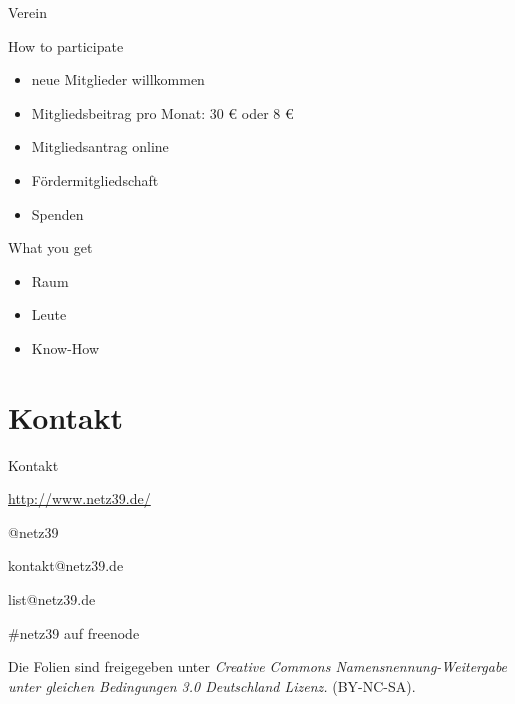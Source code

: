 \documentclass[hyperref={pdfpagelabels=false}]{beamer}
\begin{document}
\begin{frame}{Verein}
    \begin{block}{How to participate}
        \begin{itemize}
            \item neue Mitglieder willkommen
            \item Mitgliedsbeitrag pro Monat: 30 € oder 8 €
            \item Mitgliedsantrag online
            \pause
            \item Fördermitgliedschaft
            \item Spenden
        \end{itemize}
    \end{block}
    \pause
    \begin{block}{What you get}
        \begin{itemize}
            \item Raum
            \item Leute
            \item Know-How
        \end{itemize}
    \end{block}
\end{frame}

\section{Kontakt}

\begin{frame}{Kontakt}
    \begin{description}
        \item[WWW] \url{http://www.netz39.de/}
        \item[Twitter/identi.ca] @netz39
        \item[E-Mail] kontakt@netz39.de
        \item[Mailingliste] list@netz39.de
        \item[IRC] \#netz39 auf freenode
    \end{description}

    \vspace{1em}
    \small
    Die Folien sind freigegeben unter \emph{Creative Commons
    Namensnennung-Weitergabe unter gleichen Bedingungen 3.0 Deutschland
    Lizenz.} (BY-NC-SA).
    \normalsize
\end{frame}
\end{document}
